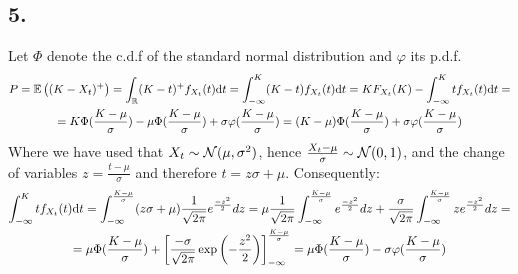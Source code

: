 \subsection*{5.}
Let $\Phi$ denote the c.d.f of the standard normal distribution and $\varphi$ its p.d.f.
\begin{gather*}
    P=\mathbb{E}\left( (K-X_t)^+ \right)=\int_{\mathbb{R}}(K-t)^+ f_{X_t}(t)\mathrm{d}t=\int_{-\infty}^K (K-t)f_{X_t}(t)\mathrm{d}t=K F_{X_t}(K)-\int_{-\infty}^K tf_{X_t}(t)\mathrm{d}t=\\=K\Phi(\frac{K-\mu}{\sigma})-\mu\Phi(\frac{K-\mu}{\sigma})+\sigma\varphi(\frac{K-\mu}{\sigma})=(K-\mu)\Phi(\frac{K-\mu}{\sigma})+\sigma\varphi(\frac{K-\mu}{\sigma})
\end{gather*}
Where we have used that $X_t\sim \mathcal{N}(\mu, \sigma^2)$, hence $\frac{X_t-\mu}{\sigma}\sim \mathcal{N}(0, 1)$, and the change of variables $z=\frac{t-\mu}{\sigma}$ and therefore $t=z\sigma+\mu$. Consequently:
\begin{gather*}
    \int_{-\infty}^K tf_{X_t}(t)\mathrm{d}t=\int_{-\infty}^\frac{K-\mu}{\sigma} (z\sigma+\mu)\frac{1}{\sqrt{2\pi}}e^\frac{-z^2}{2}dz=\mu\frac{1}{\sqrt{2\pi}}\int_{-\infty}^{\frac{K-\mu}{\sigma}} e^\frac{-z^2}{2}dz+\frac{\sigma}{\sqrt{2\pi}}\int_{-\infty}^{\frac{K-\mu}{\sigma}} ze^\frac{-z^2}{2}dz=\\
    =\mu\Phi(\frac{K-\mu}{\sigma})+\left[ \frac{-\sigma}{\sqrt{2\pi}} \exp\left(-\frac{z^2}{2}\right)\right]_{-\infty}^\frac{K-\mu}{\sigma}=\mu\Phi(\frac{K-\mu}{\sigma})-\sigma\varphi(\frac{K-\mu}{\sigma})
\end{gather*}


\newpage
